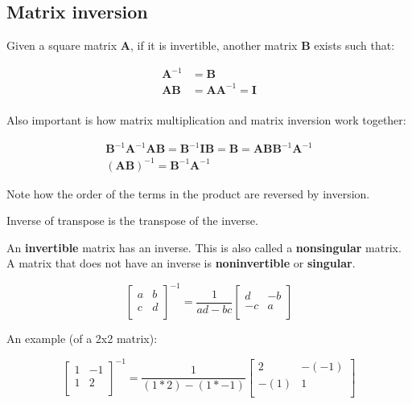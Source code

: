 \documentclass[a4paper,12pt]{article}
\newcommand{\matr}[1]{\mathbf{#1}}
\begin{document}
\subsection{Matrix inversion}

Given a square matrix $\matr{A}$, if it is invertible, another matrix $\matr{B}$ exists such that:

\begin{align*}
\matr{A}^{-1} & = \matr{B}\\
\matr{A}\matr{B} & = \matr{A}\matr{A}^{-1} = \matr{I}\\
\end{align*}

Also important is how matrix multiplication and matrix inversion work together:

\begin{align*}
\matr{B}^{-1}\matr{A}^{-1}\matr{A}\matr{B} = \matr{B}^{-1}\matr{I}\matr{B} = \matr{B} = \matr{A}\matr{B}\matr{B}^{-1}\matr{A}^{-1}\\
(\matr{A}\matr{B})^{-1} = \matr{B}^{-1}\matr{A}^{-1}
\end{align*}

Note how the order of the terms in the product are reversed by inversion.

Inverse of transpose is the transpose of the inverse.

An \textbf{invertible} matrix has an inverse. This is also called a \textbf{nonsingular} matrix. A matrix that does not have an inverse is \textbf{noninvertible} or \textbf{singular}.

\begin{equation*}
\begin{bmatrix}
 a & b \\
 c & d \\
\end{bmatrix}^{-1} = 
\dfrac{1}{ad-bc}
\begin{bmatrix}
 d & -b \\
 -c & a \\
\end{bmatrix}
\end{equation*}


An example (of a 2x2 matrix):

\begin{equation*}
\begin{bmatrix}
 1 & -1 \\
 1 & 2 \\
\end{bmatrix}^{-1} = 
\dfrac{1}{(1*2)-(1*-1)}
\begin{bmatrix}
 2 & -(-1) \\
 -(1) & 1 \\
\end{bmatrix}
\end{equation*}
\end{document}
